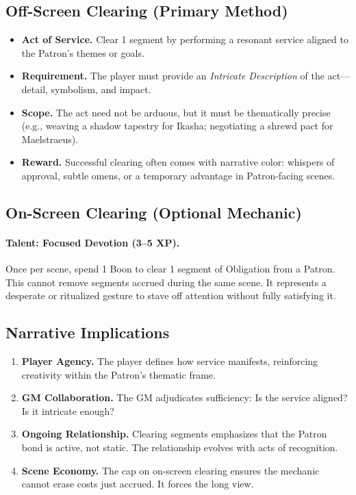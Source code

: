 \subsection{Off-Screen Clearing (Primary Method)}\label{subsec:obligation-offscreen}
\begin{itemize}
\item \textbf{Act of Service.} Clear 1 segment by performing a resonant service aligned to the Patron’s themes or goals.
\item \textbf{Requirement.} The player must provide an \emph{Intricate Description} of the act—detail, symbolism, and impact.
\item \textbf{Scope.} The act need not be arduous, but it must be thematically precise (e.g., weaving a shadow tapestry for Ikasha; negotiating a shrewd pact for Maelstraeus).
\item \textbf{Reward.} Successful clearing often comes with narrative color: whispers of approval, subtle omens, or a temporary advantage in Patron-facing scenes.
\end{itemize}

\subsection{On-Screen Clearing (Optional Mechanic)}\label{subsec:obligation-onscreen}
\paragraph{Talent: Focused Devotion (3–5 XP).} Once per scene, spend 1 Boon to clear 1 segment of Obligation from a Patron. This cannot remove segments accrued during the same scene. It represents a desperate or ritualized gesture to stave off attention without fully satisfying it.

\subsection{Narrative Implications}\label{subsec:obligation-implications}
\begin{enumerate}
\item \textbf{Player Agency.} The player defines how service manifests, reinforcing creativity within the Patron’s thematic frame.
\item \textbf{GM Collaboration.} The GM adjudicates sufficiency: Is the service aligned? Is it intricate enough?
\item \textbf{Ongoing Relationship.} Clearing segments emphasizes that the Patron bond is active, not static. The relationship evolves with acts of recognition.
\item \textbf{Scene Economy.} The cap on on-screen clearing ensures the mechanic cannot erase costs just accrued. It forces the long view.
\end{enumerate}

